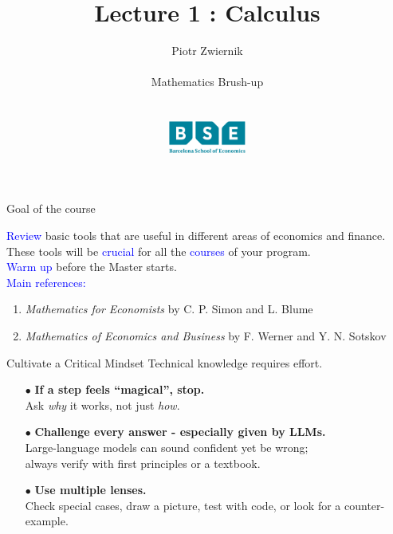 \documentclass[11pt,aspectratio=169]{beamer}
\title[Calculus and Linear Algebra]{Lecture 1 : Calculus}
\author[Piotr Zwiernik, Barcelona School of Economics]{Piotr Zwiernik \\ $\;$\\
Mathematics Brush-up\\ $\;$\\ $\;$\\
\includegraphics[width=1in]{img/bse.png}  
}
\date{}
\begin{document}
\begin{frame}
\titlepage
\end{frame}





\begin{frame}{Goal of the course}

\textcolor{blue}{Review} basic tools that are useful in different areas of economics and finance.\\[6mm]

These tools will be \textcolor{blue}{crucial} for all the \textcolor{blue}{courses} of your program.\\[6mm]

\textcolor{blue}{Warm up} before the Master starts.\\[6mm]

\textcolor{blue}{Main references:} 
\begin{enumerate}
\item {\it Mathematics for Economists} by C. P. Simon and L. Blume

\item {\it Mathematics of Economics and Business} by F. Werner and Y. N. Sotskov
\end{enumerate}\end{frame}

\begin{frame}{Cultivate a Critical Mindset}
Technical knowledge requires effort. 
\begin{itemize}
  \item [$\bullet$] \textbf{If a step feels ``magical'', stop.} \\ 
        \quad Ask \emph{why} it works, not just \emph{how}.  \\[5mm]
        \smallskip
  \item [$\bullet$] \textbf{Challenge every answer - especially given by LLMs.} \\ 
        \quad Large-language models can sound confident yet be wrong;\\  
        \qquad always verify with first principles or a textbook.\\[5mm]
        \smallskip
  \item [$\bullet$] \textbf{Use multiple lenses.}\\  
        Check special cases, draw a picture, test with code, or look for a counter-example.
\end{itemize}
\end{frame}
\end{document}
